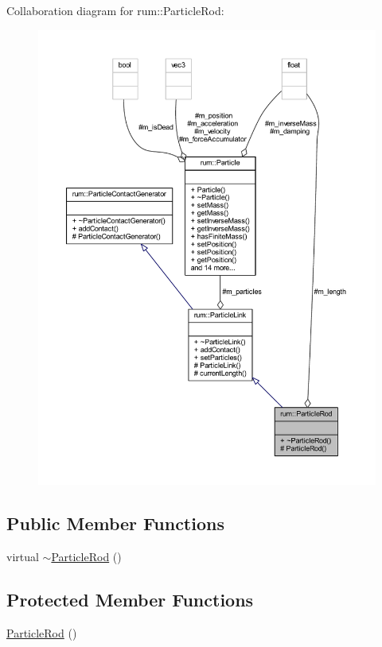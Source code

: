 Collaboration diagram for rum\+:\+:Particle\+Rod\+:\nopagebreak
\begin{figure}[H]
\begin{center}
\leavevmode
\includegraphics[width=350pt]{classrum_1_1_particle_rod__coll__graph}
\end{center}
\end{figure}
\subsection*{Public Member Functions}
\begin{DoxyCompactItemize}
\item 
virtual \mbox{\hyperlink{classrum_1_1_particle_rod_a59886e0bd126236a5f4cf1098ac39122}{$\sim$\+Particle\+Rod}} ()
\end{DoxyCompactItemize}
\subsection*{Protected Member Functions}
\begin{DoxyCompactItemize}
\item 
\mbox{\hyperlink{classrum_1_1_particle_rod_a76dc622d8d214830fc8b270e7cc21efc}{Particle\+Rod}} ()
\end{DoxyCompactItemize}
